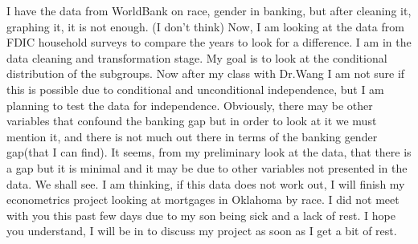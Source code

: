 \documentclass{article}
\begin{document}
I have the data from WorldBank on race, gender in banking, but after cleaning it, graphing it, it is not enough. (I don't think)
Now, I am looking at the data from FDIC household surveys to compare the years to look for a difference. I am in the data cleaning and transformation stage. My goal is to look at the conditional distribution of the subgroups. Now after my class with Dr.Wang I am not sure if this is possible due to conditional and unconditional independence, but I am planning to test the data for independence. Obviously, there may be other variables that confound the banking gap but in order to look at it we must mention it, and there is not much out there in terms of the banking gender gap(that I can find).
It seems, from my preliminary look at the data, that there is a gap but it is minimal and it may be due to other variables not presented in the data. We shall see. 
I am thinking, if this data does not work out, I will finish my econometrics project looking at mortgages in Oklahoma by race. I did not meet with you this past few days due to my son being sick and a lack of rest. I hope you understand, I will be in to discuss my project as soon as I get a bit of rest. 
\end{document}
